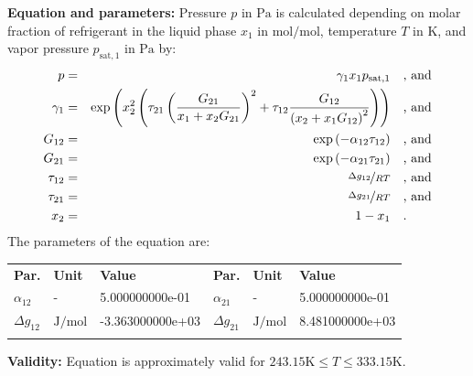\textbf{Equation and parameters:}
\newline
%
Pressure $p$ in $\si{\pascal}$ is calculated depending on molar fraction of refrigerant in the liquid phase $x_1$ in $\si{\mole\per\mole}$, temperature $T$ in $\si{\kelvin}$, and vapor pressure $p_\mathrm{sat,1}$ in $\si{\pascal}$ by:
%
\begin{equation*}
\begin{split}
p &=& \gamma_1 x_1 p_\mathrm{sat,1} & \quad\text{, and} \\
\gamma_1 &=& \exp \left( x_2^2 \left( \tau_{21} \left( \frac{G_{21}}{x_1 + x_2 G_{21}} \right) ^2 + \tau_{12} \frac{G_{12}}{\left( x_2 + x_1 G_{12} \right) ^2}\right) \right) & \quad\text{, and} \\
G_{12} &=& \exp \left( -\alpha_{12} \tau_{12} \right) & \quad\text{, and} \\
G_{21} &=& \exp \left( -\alpha_{21} \tau_{21} \right) & \quad\text{, and} \\
\tau_{12} &=& \nicefrac{\Delta g_{12}}{R T} & \quad\text{, and} \\
\tau_{21} &=& \nicefrac{\Delta g_{21}}{R T} & \quad\text{, and} \\
x_2 &=& 1 - x_1  & \quad\text{.} \\
\end{split}
\end{equation*}
%
The parameters of the equation are:
%
\begin{longtable}[l]{lll|lll}
\toprule
\addlinespace
\textbf{Par.} & \textbf{Unit} & \textbf{Value} &	\textbf{Par.} & \textbf{Unit} & \textbf{Value} \\
\addlinespace
\midrule
\endhead

\bottomrule
\endfoot
\bottomrule
\endlastfoot
\addlinespace

$\alpha_{12}$ & - & 5.000000000e-01 & $\alpha_{21}$ & - & 5.000000000e-01 \\
$\Delta g_{12}$ & $\si{\joule\per\mole}$ & -3.363000000e+03 & $\Delta g_{21}$ & $\si{\joule\per\mole}$ & 8.481000000e+03 \\

\addlinespace\end{longtable}

\textbf{Validity:}
\newline
Equation is approximately valid for $243.15 \si{\kelvin} \leq T \leq 333.15 \si{\kelvin}$.
\newline

